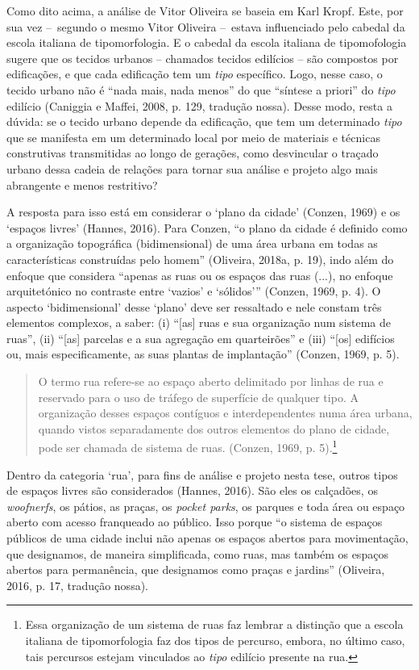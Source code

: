 \documentclass[12pt, a4paper]{book} %
\begin{document}
        Como dito acima, a análise de Vitor Oliveira se baseia em Karl Kropf. Este, por sua vez – segundo o mesmo Vitor Oliveira – estava influenciado pelo cabedal da escola italiana de tipomorfologia. E o cabedal da escola italiana de tipomofologia sugere que os tecidos urbanos – chamados tecidos edilícios – são compostos por edificações, e que cada edificação tem um \textit{tipo} específico. Logo, nesse caso, o tecido urbano não é ``nada mais, nada menos'' do que ``síntese a priori'' do \textit{tipo} edilício (Caniggia e Maffei, 2008, p. 129, tradução nossa). Desse modo, resta a dúvida: se o tecido urbano depende da edificação, que tem um determinado \textit{tipo} que se manifesta em um determinado local por meio de materiais e técnicas construtivas transmitidas ao longo de gerações, como desvincular o traçado urbano dessa cadeia de relações para tornar sua análise e projeto algo mais abrangente e menos restritivo?

        A resposta para isso está em considerar o `plano da cidade' (Conzen, 1969) e os `espaços livres' (Hannes, 2016). Para Conzen, ``o plano da cidade é definido como a organização topográfica (bidimensional) de uma área urbana em todas as características construídas pelo homem'' (Oliveira, 2018a, p. 19), indo além do enfoque que considera ``apenas as ruas ou os espaços das ruas (...), no enfoque arquitetónico no contraste entre `vazios' e `sólidos''' (Conzen, 1969, p. 4). O aspecto `bidimensional' desse `plano' deve ser ressaltado e nele constam três elementos complexos, a saber: (i) ``[as] ruas e sua organização num sistema de ruas'', (ii) ``[as] parcelas e a sua agregação em quarteirões'' e (iii) ``[os] edifícios ou, mais especificamente, as suas plantas de implantação'' (Conzen, 1969, p. 5).

        \begin{quotation}
            O termo rua refere-se ao espaço aberto delimitado por linhas de rua e reservado para o uso de tráfego de superfície de qualquer tipo. A organização desses espaços contíguos e interdependentes numa área urbana, quando vistos separadamente dos outros elementos do plano de cidade, pode ser chamada de sistema de ruas. (Conzen, 1969, p. 5).\footnote[1]{Essa organização de um sistema de ruas faz lembrar a distinção que a escola italiana de tipomorfologia faz dos tipos de percurso, embora, no último caso, tais percursos estejam vinculados ao \textit{tipo} edilício presente na rua.}
        \end{quotation}

        Dentro da categoria `rua', para fins de análise e projeto nesta tese, outros tipos de espaços livres são considerados (Hannes, 2016). São eles os calçadões, os \textit{woofnerfs}, os pátios, as praças, os \textit{pocket parks}, os parques e toda área ou espaço aberto com acesso franqueado ao público. Isso porque ``o sistema de espaços públicos de uma cidade inclui não apenas os espaços abertos para movimentação, que designamos, de maneira simplificada, como ruas, mas também os espaços abertos para permanência, que designamos como praças e jardins'' (Oliveira, 2016, p. 17, tradução nossa).
\end{document}
